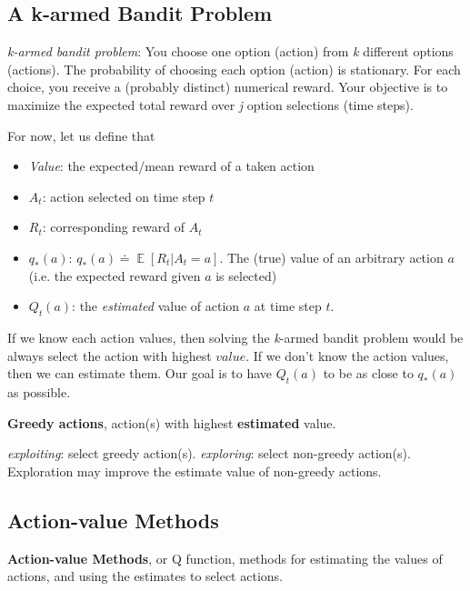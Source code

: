 \documentclass[lang=en,mode=geye,device=normal,color=blue,14pt]{elegantnote}
\DeclareMathOperator*{\E}{\mathbb{E}}
\DeclareMathOperator*{\1}{\mathbbm{1}}
\begin{document}
\subsection{A k-armed Bandit Problem}

\textit{k-armed bandit problem}:
You choose one option (action) from \textit{k} different options (actions). The probability of choosing each option (action) is stationary. For each choice, you receive a (probably distinct) numerical reward. Your objective is to maximize the expected total reward over \textit{j} option selections (time steps).

For now, let us define that
\begin{itemize}
\item \textit{Value}: the expected/mean reward of a taken action
\item $A_t$: action selected on time step $t$
\item $R_t$: corresponding reward of $A_t$
\item $q_{*}(a)$:  $q_{*}(a) \doteq \E[R_t|A_t=a]$. The (true) value of an arbitrary action $a$ (i.e. the expected reward given $a$ is selected)
\item $Q_t(a)$: the \textit{estimated} value of action $a$ at time step $t$.
\end{itemize}

If we know each action values, then solving the \textit{k}-armed bandit problem would be always select the action with highest $value$.
If we don't know the action values, then we can estimate them.
Our goal is to have $Q_t(a)$ to be as close to $q_*(a)$ as possible.

\begin{definition}
\textbf{Greedy actions}, action(s) with highest \textbf{estimated} value.
\end{definition}
\textit{exploiting}: select greedy action(s).
\textit{exploring}: select non-greedy action(s). Exploration may improve the estimate value of non-greedy actions.

\subsection{Action-value Methods}

\begin{definition}
\textbf{Action-value Methods}, or Q function, methods for estimating the values of actions, and using the estimates to select actions.
\end{definition}
\end{document}

